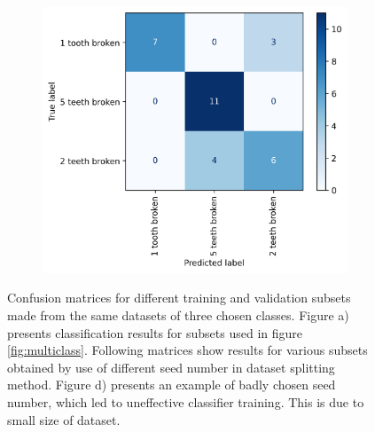 \documentclass[energies,article,submit,pdftex,moreauthors]{Definitions/mdpi}
\begin{document}
\begin{figure}[t!]
\begin{subfigure}[t]{0.3\textwidth}
        \caption{}
    \end{subfigure}
    ~ 
    \begin{subfigure}[t]{0.3\textwidth}
        \centering
        \includegraphics[width=\linewidth]{images/confusion_matrix_multiclass_5}
        \caption{}
    \end{subfigure}
    
    \caption{Confusion matrices for different training and validation subsets made from the same datasets of three chosen classes. Figure a) presents classification results for subsets used in figure \ref{fig:multiclass}. Following matrices show results for various subsets obtained by use of different seed number in dataset splitting method. Figure d) presents an example of badly chosen seed number, which led to uneffective classifier training. This is due to small size of dataset.}
\end{figure}
\unskip
\vspace{5mm}





\end{document}
